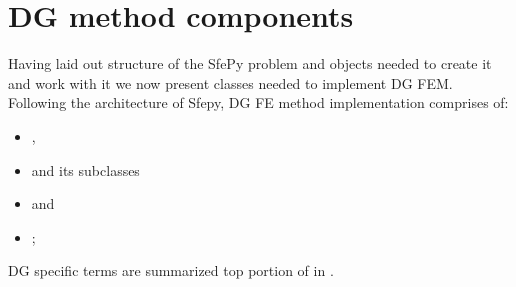 \section{DG method components}
Having laid out structure of the SfePy problem and objects needed to create it and work 
with it we now present classes needed to implement DG FEM. Following the architecture of 
Sfepy, DG FE method implementation comprises of: 
\begin{itemize}
    \item {}, 
    \item {} and its subclasses
    \item {} and
    \item {};
\end{itemize}
DG specific terms are summarized top portion of in .


